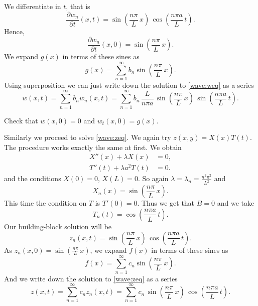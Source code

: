 We differentiate in $t$, that is
\begin{equation*}
\frac{\partial w_n}{\partial t}(x,t) = 
\sin \left( \frac{n \pi}{L} \, x \right) \,
\cos \left( \frac{n \pi a}{L} \, t \right) .
\end{equation*}
Hence,
\begin{equation*}
\frac{\partial w_n}{\partial t}(x,0) =
\sin \left( \frac{n \pi}{L} \, x \right) .
\end{equation*}
We expand $g(x)$ in terms of these sines as
\begin{equation*}
g(x) =
\sum_{n=1}^\infty b_n \sin \left( \frac{n \pi}{L} \, x \right) .
\end{equation*}
Using superposition
we can just write down the solution to \eqref{wave:weq} as a series
\begin{equation*}
w(x,t) =
\sum_{n=1}^\infty
b_n
w_n(x,t)
=
\sum_{n=1}^\infty
b_n \,
\frac{L}{n \pi a} \,
\sin \left( \frac{n \pi}{L} \, x \right) \,
\sin \left( \frac{n \pi a}{L} \, t \right) .
\end{equation*}

\begin{exercise}
Check that $w(x,0) = 0$ and
$w_t(x,0) = g(x)$.
\end{exercise}

Similarly we proceed to solve \eqref{wave:zeq}.  We again try
$z(x,y) = X(x)T(t)$.  The procedure works exactly the same at first.
We obtain
\begin{align*}
X''(x) + \lambda X(x) &= 0 , \\
T''(t) + \lambda a^2 T(t) &= 0 .
\end{align*}
and the conditions $X(0) = 0$, $X(L) = 0$.  So again
$\lambda = \lambda_n = \frac{n^2 \pi^2}{L^2}$ and
\begin{equation*}
X_n(x) = \sin \left( \frac{n \pi}{L} \, x \right) .
\end{equation*}
This time
the condition on $T$ is $T'(0) = 0$.  Thus 
we get that $B = 0$ and we take
\begin{equation*}
T_n(t) = \cos \left( \frac{n \pi a}{L} \, t \right).
\end{equation*}
Our building-block solution will be
\begin{equation*}
z_n(x,t) = 
\sin \left( \frac{n \pi}{L} \, x \right) \,
\cos \left( \frac{n \pi a}{L} \, t \right) .
\end{equation*}
As $z_n(x,0) = \sin \left( \frac{n \pi}{L} \, x \right)$,
we expand $f(x)$ in terms of these sines as
\begin{equation*}
f(x) =
\sum_{n=1}^\infty c_n \sin \left( \frac{n \pi}{L} \, x \right) .
\end{equation*}
And we
write down the solution to \eqref{wave:zeq} as a series
\begin{equation*}
z(x,t) =
\sum_{n=1}^\infty
c_n
z_n(x,t)
=
\sum_{n=1}^\infty
c_n \,
\sin \left( \frac{n \pi}{L} \, x \right) \,
\cos \left( \frac{n \pi a}{L} \, t \right) .
\end{equation*}


